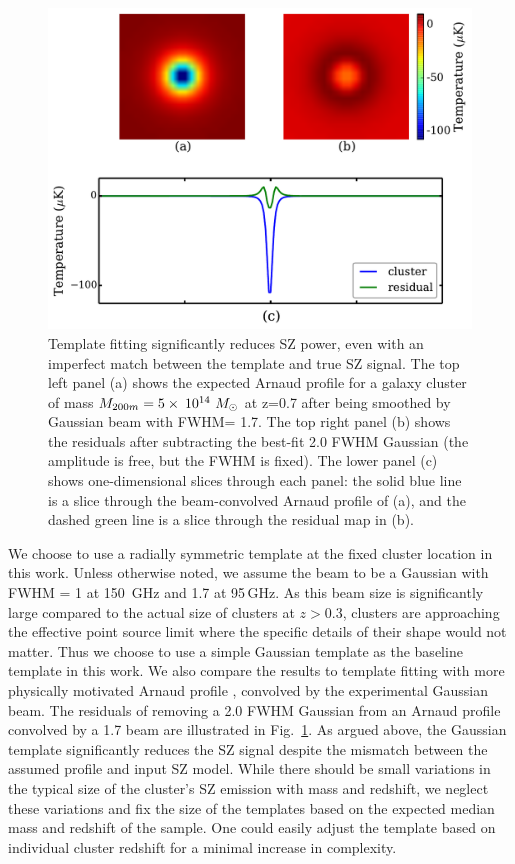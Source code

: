 \begin{figure}[ht]
\includegraphics[width=\linewidth, keepaspectratio]{figs/template_fitting.pdf}
 \caption{Template fitting significantly reduces SZ power, even with an imperfect match between the template and true SZ signal. 
The top left panel (a) shows the expected Arnaud profile for a galaxy cluster of mass $M_{200m} = 5 \times \:10^{14}~ {M}_{\odot}$ at z=0.7 after being smoothed by Gaussian beam with FWHM= 1\arcmin.7.
The top right panel (b) shows the residuals after subtracting the best-fit 2\arcmin.0 FWHM Gaussian (the amplitude is free, but the FWHM is fixed). 
The lower panel (c) shows one-dimensional slices through each panel: the solid blue line is a slice through the beam-convolved Arnaud profile of (a), and the dashed green line is a slice through the residual map in (b). 
 } 
\label{fig:residual}
\end{figure}
We choose to use a radially symmetric template at the fixed cluster location in this work. 
Unless otherwise noted, we assume the beam to be a Gaussian with FWHM = 1\arcmin{} at 150\, GHz and 1\arcmin.7 at 95\,GHz. 
As this beam size is significantly large compared to the actual size of clusters at $z>0.3$, clusters are approaching the effective point source limit where the specific details of their shape would not matter. 
Thus we choose to use a simple Gaussian template as the baseline template in this work. 
We also compare the results to template fitting with more physically motivated Arnaud profile \citep{arnaud10}, convolved by the experimental Gaussian beam.  
The residuals of removing a 2\arcmin.0 FWHM Gaussian from an Arnaud profile convolved by a 1\arcmin.7 beam are illustrated in Fig.~\ref{fig:residual}. 
As argued above, the Gaussian template significantly reduces the SZ signal despite the mismatch between the assumed profile and input SZ model. 
While there should be small variations in the typical size of the cluster's SZ emission with mass and redshift, we neglect these variations and fix the size of the templates based on the expected median mass and redshift of the sample. 
One could easily adjust the template based on individual cluster redshift for a minimal increase in complexity.



